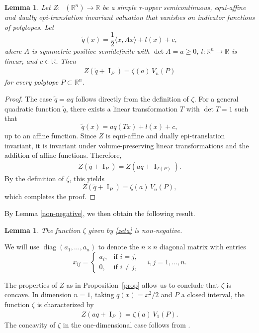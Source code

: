 \documentclass[11pt]{article}
\newtheorem{lema}[teo]{Lemma}
\theoremstyle{definition} %
\DeclareMathOperator{\I}{I}
\DeclareMathOperator{\diag}{diag}
\DeclareMathOperator{\LP}{Conv_{lp}}
\begin{document}
\begin{lema}
Let $Z:\LP(\mathbb{R}^n)\to\mathbb{R}$ be a simple $\tau$-upper semicontinuous, equi-affine and dually epi-translation invariant valuation that vanishes on indicator functions of polytopes. Let
$$
\tilde{q}(x)= \frac{1}{2}\langle x, Ax \rangle + l(x) + c,
$$
where $A$ is symmetric positive semidefinite with $\det A=a\geq 0$, $l:\mathbb{R}^n\to\mathbb{R}$ is linear, and $c\in\mathbb{R}$. Then
\begin{align}\label{mudanca_zeta}
   Z(\tilde{q}+\I_P)=\zeta(a)\,V_n(P)
\end{align}
for every polytope $P\subset\mathbb{R}^n$.
\end{lema}


\begin{proof}
The case $\tilde{q}=aq$ follows directly from the definition of $\zeta$.  For a general quadratic function $\tilde{q}$, there exists a linear transformation $T$ with $\det T=1$ such that
$$
\tilde{q}(x)= aq(Tx) + l(x) + c,
$$
up to an affine function.  Since $Z$ is equi-affine and dually epi-translation invariant, it is invariant under volume-preserving linear transformations and the addition of affine functions. Therefore,
\begin{align*}
Z(\tilde{q}+\I_P)
= Z(aq + \I_{T(P)}).
\end{align*}
By the definition of $\zeta$, this yields
$$
Z(\tilde{q}+\I_P)=\zeta(a)\,V_n(P),
$$
which completes the proof.
\end{proof}


By Lemma \ref{non-negative}, we then obtain the following result.

\begin{lema}\label{positive}
The function $\zeta$ given by \eqref{zeta} is non-negative.
\end{lema}


We will use  $\diag(a_1, \dots, a_n)$  to denote the $n \times n$ diagonal matrix with entries 
$$
x_{ij} = 
\begin{cases} 
a_i, & \text{if } i=j,\\
0, & \text{if } i\neq j,
\end{cases} 
\quad i,j=1,\dots,n.
$$



The properties of $Z$ as in Proposition~\ref{prop} allow us to conclude that $\zeta$ is concave. In dimension $n=1$, taking $q(x)=x^2/2$ and $P$ a closed interval, the function $\zeta$ is characterized by
\begin{align*}
    Z(aq+\I_P)=\zeta(a)\,V_1(P).
\end{align*}
The concavity of $\zeta$ in the one-dimensional case follows from \cite[Lemma 17]{baeta1d}.
\end{document}
